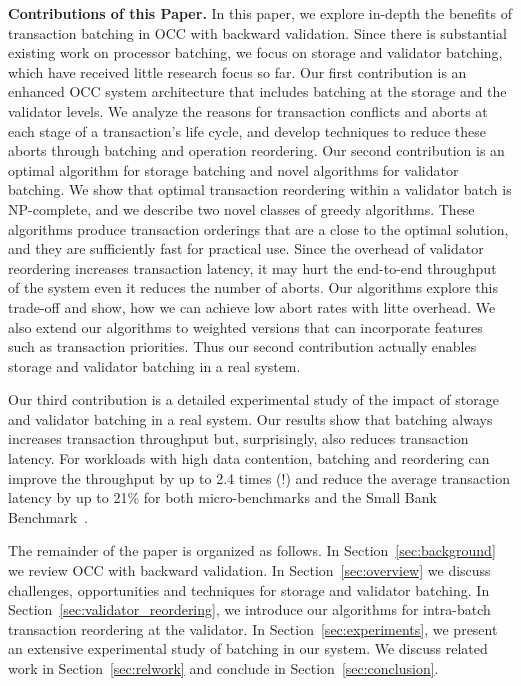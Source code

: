 {\bf Contributions of this Paper.}
In this paper, we explore in-depth the benefits of transaction batching in OCC with backward validation. Since there is substantial existing work on processor batching, we focus on storage and validator batching, which have received little research focus so far.
Our first contribution is an enhanced OCC system architecture that includes batching at the storage and the validator levels. We analyze the reasons for transaction conflicts and aborts at each stage of a transaction's life cycle, and develop techniques to reduce these aborts through batching and operation reordering.
Our second contribution is an optimal algorithm for storage batching and novel algorithms for validator batching. We show that optimal transaction reordering within a validator batch is NP-complete, and we describe two novel classes of greedy algorithms. These algorithms produce transaction orderings that are a close to the optimal solution, and they are sufficiently fast for practical use. Since the overhead of validator reordering increases transaction latency, it may hurt the end-to-end throughput of the system even it reduces the number of aborts. Our algorithms explore this trade-off and show, how we can achieve low abort rates with litte overhead. We also extend our algorithms to weighted versions that can incorporate features such as transaction priorities. Thus our second contribution actually enables storage and validator batching in a real system.



Our third contribution is a detailed experimental study of the impact of storage and validator batching in a real system. Our results show that batching always increases transaction throughput but, surprisingly, also reduces transaction latency. For workloads with high data contention, batching and reordering can improve the throughput by up to 2.4 times (!) and reduce the average transaction latency by up to 21\% for both micro-benchmarks and the Small Bank Benchmark~\cite{alomari2008icde}.

The remainder of the paper is organized as follows. In Section~\ref{sec:background}  we review OCC with backward validation. In Section~\ref{sec:overview} we discuss challenges, opportunities and techniques for storage and validator batching. In Section~\ref{sec:validator_reordering}, we introduce our algorithms for intra-batch transaction reordering at the validator. In Section~\ref{sec:experiments}, we present an extensive experimental study of batching in our system. We discuss related work in Section~\ref{sec:relwork} and conclude in Section~\ref{sec:conclusion}.

